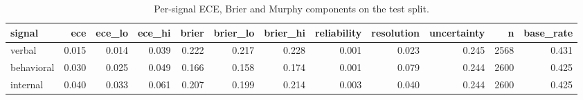 \begin{table}
\caption{Per-signal ECE, Brier and Murphy components on the test split.}
\label{tab:t6_h1_murphy_decomposition}
\begin{tabular}{lrrrrrrrrrrr}
\toprule
signal & ece & ece\_lo & ece\_hi & brier & brier\_lo & brier\_hi & reliability & resolution & uncertainty & n & base\_rate \\
\midrule
verbal & 0.015 & 0.014 & 0.039 & 0.222 & 0.217 & 0.228 & 0.001 & 0.023 & 0.245 & 2568 & 0.431 \\
behavioral & 0.030 & 0.025 & 0.049 & 0.166 & 0.158 & 0.174 & 0.001 & 0.079 & 0.244 & 2600 & 0.425 \\
internal & 0.040 & 0.033 & 0.061 & 0.207 & 0.199 & 0.214 & 0.003 & 0.040 & 0.244 & 2600 & 0.425 \\
\bottomrule
\end{tabular}
\end{table}
